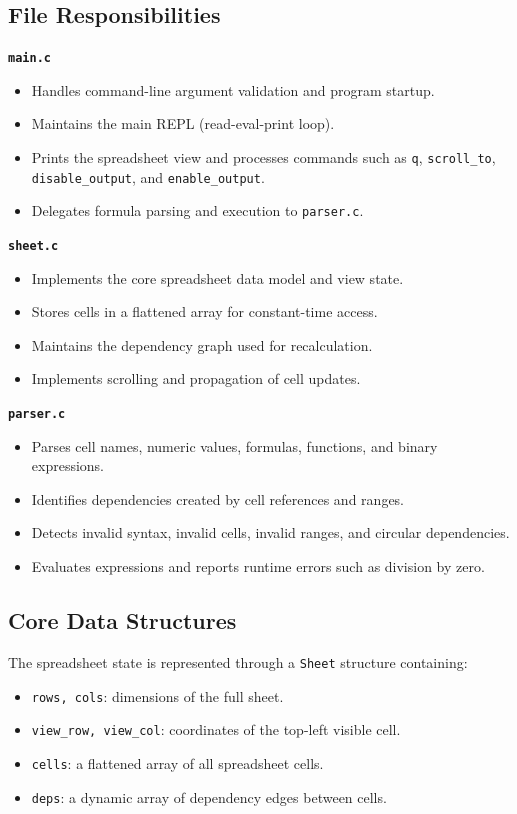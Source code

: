 \documentclass[12pt,a4paper]{article}
\begin{document}
\subsection{File Responsibilities}

\textbf{\texttt{main.c}}
\begin{itemize}
    \item Handles command-line argument validation and program startup.
    \item Maintains the main REPL (read-eval-print loop).
    \item Prints the spreadsheet view and processes commands such as \texttt{q}, \texttt{scroll\_to}, \texttt{disable\_output}, and \texttt{enable\_output}.
    \item Delegates formula parsing and execution to \texttt{parser.c}.
\end{itemize}

\noindent\textbf{\texttt{sheet.c}}
\begin{itemize}
    \item Implements the core spreadsheet data model and view state.
    \item Stores cells in a flattened array for constant-time access.
    \item Maintains the dependency graph used for recalculation.
    \item Implements scrolling and propagation of cell updates.
\end{itemize}

\noindent\textbf{\texttt{parser.c}}
\begin{itemize}
    \item Parses cell names, numeric values, formulas, functions, and binary expressions.
    \item Identifies dependencies created by cell references and ranges.
    \item Detects invalid syntax, invalid cells, invalid ranges, and circular dependencies.
    \item Evaluates expressions and reports runtime errors such as division by zero.
\end{itemize}

\subsection{Core Data Structures}

The spreadsheet state is represented through a \texttt{Sheet} structure containing:
\begin{itemize}
    \item \texttt{rows, cols}: dimensions of the full sheet.
    \item \texttt{view\_row, view\_col}: coordinates of the top-left visible cell.
    \item \texttt{cells}: a flattened array of all spreadsheet cells.
    \item \texttt{deps}: a dynamic array of dependency edges between cells.
\end{itemize}
\end{document}

